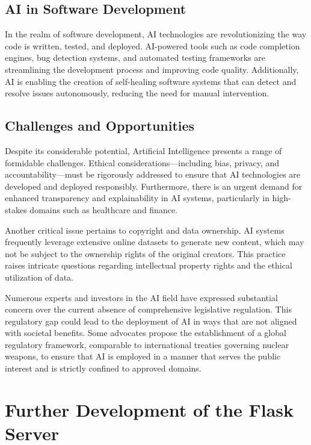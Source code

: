 \subsection{AI in Software Development}

In the realm of software development, AI technologies are revolutionizing the way code is written, tested, and deployed. 
AI-powered tools such as code completion engines, bug detection systems, and automated testing frameworks are streamlining the development process and improving code quality. 
Additionally, AI is enabling the creation of self-healing software systems that can detect and resolve issues autonomously, reducing the need for manual intervention.

\subsection{Challenges and Opportunities}
\label{ref:challanges-and-opportunities}

Despite its considerable potential, Artificial Intelligence presents a range of formidable challenges. Ethical considerations—including bias, privacy, and accountability—must be rigorously addressed to ensure that AI technologies are developed and deployed responsibly. Furthermore, there is an urgent demand for enhanced transparency and explainability in AI systems, particularly in high-stakes domains such as healthcare and finance.

Another critical issue pertains to copyright and data ownership. AI systems frequently leverage extensive online datasets to generate new content, which may not be subject to the ownership rights of the original creators. This practice raises intricate questions regarding intellectual property rights and the ethical utilization of data.

Numerous experts and investors in the AI field have expressed substantial concern over the current absence of comprehensive legislative 
regulation. This regulatory gap could lead to the deployment of AI in ways that are not aligned with societal benefits. 
Some advocates propose the establishment of a global regulatory framework, comparable to international treaties governing 
nuclear weapons, to ensure that AI is employed in a manner that serves the public interest and is strictly confined to approved domains.

\cite{un-report}

\section{Further Development of the Flask Server}

